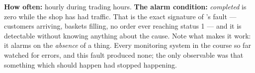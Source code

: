 \begin{ans}
        \smallskip
        \textbf{How often:} hourly during trading
        hours. \textbf{The alarm condition:} \emph{completed} is zero while the
        shop has had traffic. That is the exact signature of
        's fault --- customers arriving, baskets filling, no
        order ever reaching status 1 --- and it is detectable without knowing
        anything about the cause. Note what makes it work: it alarms on the
        \emph{absence} of a thing. Every monitoring system in the course so far
        watched for errors, and this fault produced none; the only observable
        was that something which should happen had stopped happening.
\end{ans}

